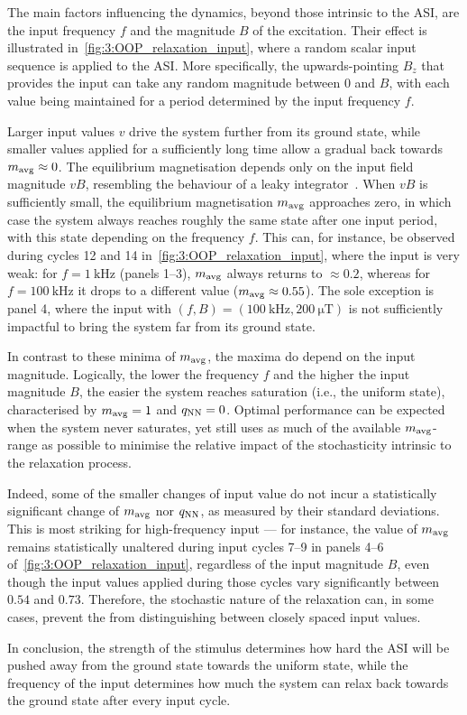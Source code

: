 The main factors influencing the dynamics, beyond those intrinsic to the ASI, are the input frequency $f$ and the magnitude $B$ of the excitation.
Their effect is illustrated in~\cref{fig:3:OOP_relaxation_input}, where a random scalar input sequence is applied to the ASI.
More specifically, the upwards-pointing  $B_z$ that provides the input can take any random magnitude between 0 and $B$, with each value being maintained for a period determined by the input frequency $f$. \par %
Larger input values $v$ drive the system further from its ground state, while smaller values applied for a sufficiently long time allow a gradual  back towards $m_\mathrm{avg} \approx 0$.
The equilibrium magnetisation depends only on the input field magnitude $vB$, resembling the behaviour of a leaky integrator~\cite{jaeger2001echo}.
When $vB$ is sufficiently small, the equilibrium magnetisation $m_\mathrm{avg}$ approaches zero, in which case the system always reaches roughly the same state after one input period, with this state depending on the frequency $f$.
This can, for instance, be observed during cycles 12 and 14 in~\cref{fig:3:OOP_relaxation_input}, where the input is very weak: for $f=\SI{1}{\kilo\hertz}$ (panels 1--3), $m_\mathrm{avg}$ always returns to $\approx 0.2$, whereas for $f=\SI{100}{\kilo\hertz}$ it drops to a different value ($m_\mathrm{avg} \approx 0.55$).
The sole exception is panel 4, where the input with $(f,B)=(\SI{100}{\kilo\hertz}, \SI{200}{\micro\tesla})$ is not sufficiently impactful to bring the system far from its ground state. \par
In contrast to these minima of $m_\mathrm{avg}$, the maxima do depend on the input magnitude.
Logically, the lower the frequency $f$ and the higher the input magnitude $B$, the easier the system reaches saturation (i.e., the uniform state), characterised by $m_\mathrm{avg}=1$ and $q_\mathrm{NN}=0$.
Optimal  performance can be expected when the system never saturates, yet still uses as much of the available $m_\mathrm{avg}$-range as possible to minimise the relative impact of the stochasticity intrinsic to the relaxation process. \par
Indeed, some of the smaller changes of input value do not incur a statistically significant change of $m_\mathrm{avg}$ nor $q_\mathrm{NN}$, as measured by their standard deviations.
This is most striking for high-frequency input --- for instance, the value of $m_\mathrm{avg}$ remains statistically unaltered during input cycles 7--9 in panels 4--6 of~\cref{fig:3:OOP_relaxation_input}, regardless of the input magnitude $B$, even though the input values applied during those cycles vary significantly between $0.54$ and $0.73$.
Therefore, the stochastic nature of the relaxation can, in some cases, prevent the  from distinguishing between closely spaced input values. \par
In conclusion, the strength of the stimulus determines how hard the ASI will be pushed away from the ground state towards the uniform state, while the frequency of the input determines how much the system can relax back towards the ground state after every input cycle.

